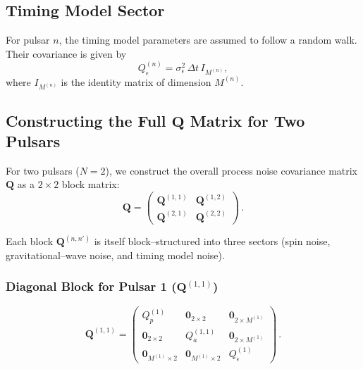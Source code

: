 \documentclass[]{scrartcl}
\begin{document}
	\subsection*{Timing Model Sector}
	
	For pulsar \(n\), the timing model parameters are assumed to follow a random walk. Their covariance is given by
	\begin{equation}
		Q_\epsilon^{(n)} = \sigma_\epsilon^2\,\Delta t\,I_{M^{(n)}},
	\end{equation}
	where \(I_{M^{(n)}}\) is the identity matrix of dimension \(M^{(n)}\).
	
	\subsection*{Constructing the Full \(\boldsymbol{Q}\) Matrix for Two Pulsars}
	
	For two pulsars (\(N=2\)), we construct the overall process noise covariance matrix \(\boldsymbol{Q}\) as a \(2\times2\) block matrix:
	\begin{equation}
		\boldsymbol{Q} =
		\begin{pmatrix}
			\boldsymbol{Q}^{(1,1)} & \boldsymbol{Q}^{(1,2)} \\[1mm]
			\boldsymbol{Q}^{(2,1)} & \boldsymbol{Q}^{(2,2)}
		\end{pmatrix}\,.
	\end{equation}
	
	Each block \(\boldsymbol{Q}^{(n,n')}\) is itself block–structured into three sectors (spin noise, gravitational–wave noise, and timing model noise).
	
	\subsubsection*{Diagonal Block for Pulsar 1 (\(\boldsymbol{Q}^{(1,1)}\))}
	
	\begin{equation}
		\boldsymbol{Q}^{(1,1)} =
		\begin{pmatrix}
			Q_p^{(1)} & \boldsymbol{0}_{2\times2} & \boldsymbol{0}_{2\times M^{(1)}} \\[2mm]
			\boldsymbol{0}_{2\times2} & Q_a^{(1,1)} & \boldsymbol{0}_{2\times M^{(1)}} \\[2mm]
			\boldsymbol{0}_{M^{(1)}\times2} & \boldsymbol{0}_{M^{(1)}\times2} & Q_\epsilon^{(1)}
		\end{pmatrix}\,.
	\end{equation}
	
\end{document}
